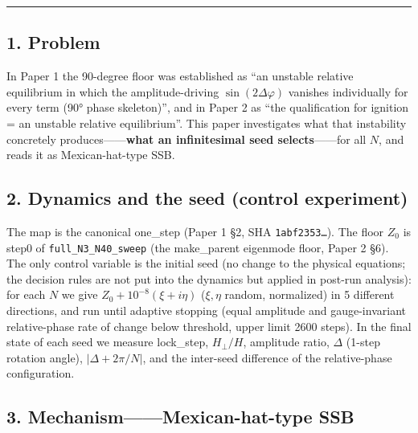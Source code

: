 \documentclass[
  a4paper,
]{ltjsarticle}
\begin{document}
\begin{center}\rule{0.5\linewidth}{0.5pt}\end{center}

\subsection{1. Problem}\label{problem}

In Paper 1 the 90-degree floor was established as ``an unstable relative
equilibrium in which the amplitude-driving \(\sin(2\Delta\varphi)\)
vanishes individually for every term (90° phase skeleton)'', and in
Paper 2 as ``the qualification for ignition = an unstable relative
equilibrium''. This paper investigates what that instability concretely
produces------\textbf{what an infinitesimal seed selects}------for all
\(N\), and reads it as Mexican-hat-type SSB.

\subsection{2. Dynamics and the seed (control
experiment)}\label{dynamics-and-the-seed-control-experiment}

The map is the canonical one\_step (Paper 1 §2, SHA \texttt{1abf2353…}).
The floor \(Z_0\) is step0 of \texttt{full\_N3\_N40\_sweep} (the
make\_parent eigenmode floor, Paper 2 §6). The only control variable is
the initial seed (no change to the physical equations; the decision
rules are not put into the dynamics but applied in post-run analysis):
for each \(N\) we give \(Z_0+10^{-8}(\xi+i\eta)\) (\(\xi,\eta\) random,
normalized) in 5 different directions, and run until adaptive stopping
(equal amplitude and gauge-invariant relative-phase rate of change below
threshold, upper limit 2600 steps). In the final state of each seed we
measure lock\_step, \(H_\perp/H\), amplitude ratio, \(\Delta\) (1-step
rotation angle), \(|\Delta+2\pi/N|\), and the inter-seed difference of
the relative-phase configuration.

\subsection{3. Mechanism------Mexican-hat-type
SSB}\label{mechanismmexican-hat-type-ssb}
\end{document}
